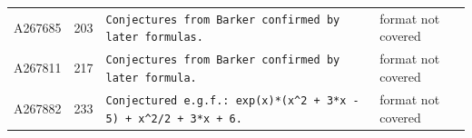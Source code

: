 \documentclass[11pt]{article}
\theoremstyle{definition}
\theoremstyle{remark}
\begin{document}
{\begin{longtable}{p{1.3cm}p{0.7cm}p{10cm}p{3cm}}
A267685 & 203 & \texttt{Conjectures \allowbreak{}from \allowbreak{}Barker \allowbreak{}confirmed \allowbreak{}by \allowbreak{}later \allowbreak{}formulas.} & format not covered \\
A267811 & 217 & \texttt{Conjectures \allowbreak{}from \allowbreak{}Barker \allowbreak{}confirmed \allowbreak{}by \allowbreak{}later \allowbreak{}formula.} & format not covered \\
A267882 & 233 & \texttt{Conjectured \allowbreak{}e.g.f.: \allowbreak{}exp(x)\allowbreak{}*\allowbreak{}(x\^{}2 \allowbreak{}+\allowbreak{} \allowbreak{}3*\allowbreak{}x \allowbreak{}-\allowbreak{} \allowbreak{}5)\allowbreak{} \allowbreak{}+\allowbreak{} \allowbreak{}x\^{}2/\allowbreak{}2 \allowbreak{}+\allowbreak{} \allowbreak{}3*\allowbreak{}x \allowbreak{}+\allowbreak{} \allowbreak{}6.} & format not covered \\
\bottomrule
\end{longtable}}
\end{document}
